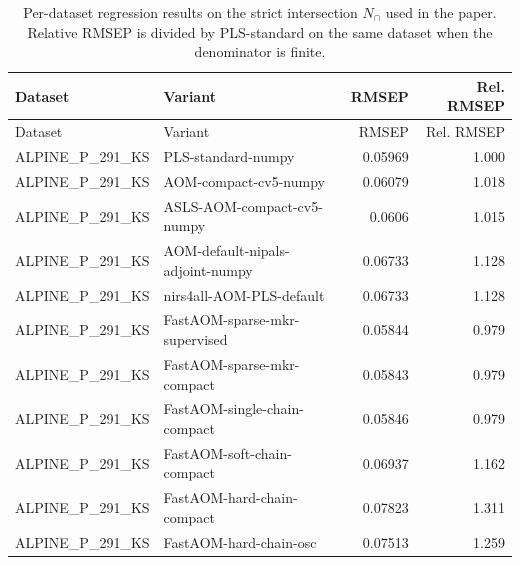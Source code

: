 \clearpage
\begin{landscape}
\begingroup
\small
\setlength{\tabcolsep}{3.0pt}
\renewcommand{\arraystretch}{1.05}
\begin{longtable}{L{8.0cm}L{9.5cm}rr}
\caption{Per-dataset regression results on the strict intersection $N_{\cap}$ used in the paper.  Relative RMSEP is divided by PLS-standard on the same dataset when the denominator is finite.}\\
\toprule
Dataset & Variant & RMSEP & Rel. RMSEP \\
\midrule
\endfirsthead
\toprule
Dataset & Variant & RMSEP & Rel. RMSEP \\
\midrule
\endhead
ALPINE\_\allowbreak{}P\_\allowbreak{}291\_\allowbreak{}KS & PLS-\allowbreak{}standard-\allowbreak{}numpy & 0.05969 & 1.000 \\
ALPINE\_\allowbreak{}P\_\allowbreak{}291\_\allowbreak{}KS & AOM-\allowbreak{}compact-\allowbreak{}cv5-\allowbreak{}numpy & 0.06079 & 1.018 \\
ALPINE\_\allowbreak{}P\_\allowbreak{}291\_\allowbreak{}KS & ASLS-\allowbreak{}AOM-\allowbreak{}compact-\allowbreak{}cv5-\allowbreak{}numpy & 0.0606 & 1.015 \\
ALPINE\_\allowbreak{}P\_\allowbreak{}291\_\allowbreak{}KS & AOM-\allowbreak{}default-\allowbreak{}nipals-\allowbreak{}adjoint-\allowbreak{}numpy & 0.06733 & 1.128 \\
ALPINE\_\allowbreak{}P\_\allowbreak{}291\_\allowbreak{}KS & nirs4all-\allowbreak{}AOM-\allowbreak{}PLS-\allowbreak{}default & 0.06733 & 1.128 \\
ALPINE\_\allowbreak{}P\_\allowbreak{}291\_\allowbreak{}KS & FastAOM-\allowbreak{}sparse-\allowbreak{}mkr-\allowbreak{}supervised & 0.05844 & 0.979 \\
ALPINE\_\allowbreak{}P\_\allowbreak{}291\_\allowbreak{}KS & FastAOM-\allowbreak{}sparse-\allowbreak{}mkr-\allowbreak{}compact & 0.05843 & 0.979 \\
ALPINE\_\allowbreak{}P\_\allowbreak{}291\_\allowbreak{}KS & FastAOM-\allowbreak{}single-\allowbreak{}chain-\allowbreak{}compact & 0.05846 & 0.979 \\
ALPINE\_\allowbreak{}P\_\allowbreak{}291\_\allowbreak{}KS & FastAOM-\allowbreak{}soft-\allowbreak{}chain-\allowbreak{}compact & 0.06937 & 1.162 \\
ALPINE\_\allowbreak{}P\_\allowbreak{}291\_\allowbreak{}KS & FastAOM-\allowbreak{}hard-\allowbreak{}chain-\allowbreak{}compact & 0.07823 & 1.311 \\
ALPINE\_\allowbreak{}P\_\allowbreak{}291\_\allowbreak{}KS & FastAOM-\allowbreak{}hard-\allowbreak{}chain-\allowbreak{}osc & 0.07513 & 1.259 \\

\end{longtable}
\end{landscape}

